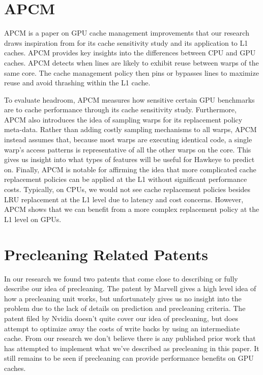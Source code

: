 \section{APCM}
APCM is a paper on GPU cache management improvements that our research draws inspiration from for its cache sensitivity study and its application to L1 caches. APCM provides key insights into the differences between CPU and GPU caches. APCM detects when lines are likely to exhibit reuse between warps of the same core. The cache management policy then pins or bypasses lines to maximize reuse and avoid thrashing within the L1 cache.

To evaluate headroom, APCM measures how sensitive certain GPU benchmarks are to cache performance through its cache sensitivity study. Furthermore, APCM also introduces the idea of sampling warps for its replacement policy meta-data. Rather than adding costly sampling mechanisms to all warps, APCM instead assumes that, because most warps are executing identical code, a single warp's access patterns is representative of all the other warps on the core. This gives us insight into what types of features will be useful for Hawkeye to predict on. Finally, APCM is notable for affirming the idea that more complicated cache replacement policies can be applied at the L1 without significant performance costs. Typically, on CPUs, we would not see cache replacement policies besides LRU replacement at the L1 level due to latency and cost concerns. However, APCM shows that we can benefit from a more complex replacement policy at the L1 level on GPUs.

\section{Precleaning Related Patents}
In our research we found two patents that come close to describing or fully describe our idea of precleaning. The patent by Marvell \cite{preclean_cpu} gives a high level idea of how a precleaning unit works, but unfortunately gives us no insight into the problem due to the lack of details on prediction and precleaning criteria. The patent filed by Nvidia \cite{preclean_nvidia_patent} doesn't quite cover our idea of precleaning, but does attempt to optimize away the costs of write backs by using an intermediate cache. From our research we don't believe there is any published prior work that has attempted to implement what we've described as precleaning in this paper. It still remains to be seen if precleaning can provide performance benefits on GPU caches.
